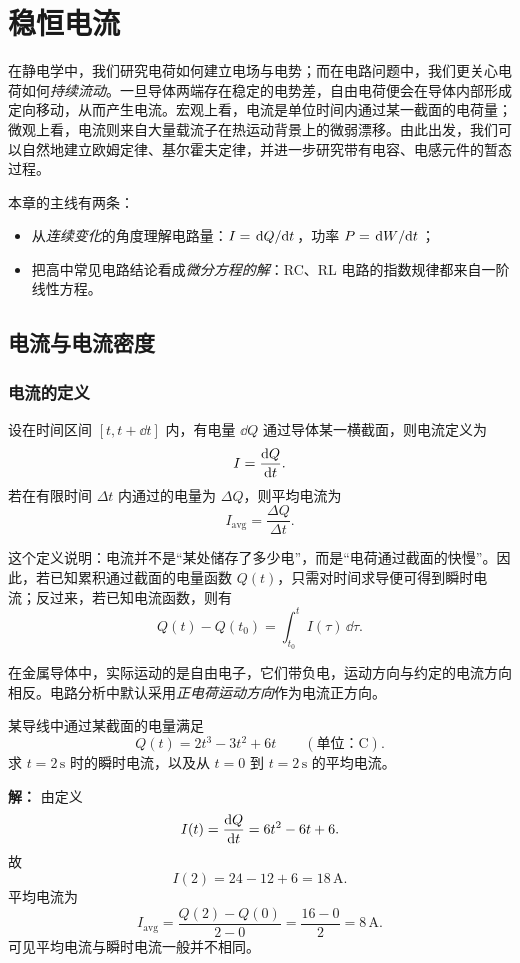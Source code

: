 \chapter{稳恒电流}

在静电学中，我们研究电荷如何建立电场与电势；而在电路问题中，我们更关心电荷如何\emph{持续流动}。一旦导体两端存在稳定的电势差，自由电荷便会在导体内部形成定向移动，从而产生电流。宏观上看，电流是单位时间内通过某一截面的电荷量；微观上看，电流则来自大量载流子在热运动背景上的微弱漂移。由此出发，我们可以自然地建立欧姆定律、基尔霍夫定律，并进一步研究带有电容、电感元件的暂态过程。

本章的主线有两条：
\begin{itemize}
  \item 从\emph{连续变化}的角度理解电路量：$I=\dv*{Q}{t}$，功率 $P=\dv*{W}{t}$；
  \item 把高中常见电路结论看成\emph{微分方程的解}：RC、RL 电路的指数规律都来自一阶线性方程。
\end{itemize}

\section{电流与电流密度}

\subsection{电流的定义}

\begin{definition}
设在时间区间 $[t,t+\dd t]$ 内，有电量 $\dd Q$ 通过导体某一横截面，则电流定义为
\[
I=\dv{Q}{t}.
\]
若在有限时间 $\Delta t$ 内通过的电量为 $\Delta Q$，则平均电流为
\[
I_{\text{avg}}=\frac{\Delta Q}{\Delta t}.
\]
\end{definition}

这个定义说明：电流并不是“某处储存了多少电”，而是“电荷通过截面的快慢”。因此，若已知累积通过截面的电量函数 $Q(t)$，只需对时间求导便可得到瞬时电流；反过来，若已知电流函数，则有
\[
Q(t)-Q(t_0)=\int_{t_0}^{t} I(\tau)\,\dd \tau.
\]

\begin{remark}
在金属导体中，实际运动的是自由电子，它们带负电，运动方向与约定的电流方向相反。电路分析中默认采用\emph{正电荷运动方向}作为电流正方向。
\end{remark}

\begin{example}
某导线中通过某截面的电量满足
\[
Q(t)=2t^3-3t^2+6t \qquad (\text{单位：C}).
\]
求 $t=2\,\text{s}$ 时的瞬时电流，以及从 $t=0$ 到 $t=2\,\text{s}$ 的平均电流。

\textbf{解：}
由定义
\[
I(t)=\dv{Q}{t}=6t^2-6t+6.
\]
故
\[
I(2)=24-12+6=18\,\text{A}.
\]
平均电流为
\[
I_{\text{avg}}=\frac{Q(2)-Q(0)}{2-0}=\frac{16-0}{2}=8\,\text{A}.
\]
可见平均电流与瞬时电流一般并不相同。
\end{example}

